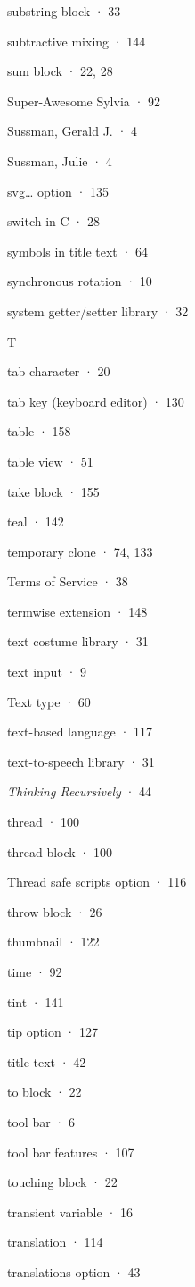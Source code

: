 \documentclass[
  letterpaper,
]{book}
\begin{document}
substring block · 33

subtractive mixing · 144

sum block · 22, 28

Super-Awesome Sylvia · 92

Sussman, Gerald J. · 4

Sussman, Julie · 4

svg\ldots{} option · 135

switch in C · 28

symbols in title text · 64

synchronous rotation · 10

system getter/setter library · 32

T

tab character · 20

tab key (keyboard editor) · 130

table · 158

table view · 51

take block · 155

teal · 142

temporary clone · 74, 133

Terms of Service · 38

termwise extension · 148

text costume library · 31

text input · 9

Text type · 60

text-based language · 117

text-to-speech library · 31

\emph{Thinking Recursively} · 44

thread · 100

thread block · 100

Thread safe scripts option · 116

throw block · 26

thumbnail · 122

time · 92

tint · 141

tip option · 127

title text · 42

to block · 22

tool bar · 6

tool bar features · 107

touching block · 22

transient variable · 16

translation · 114

translations option · 43
\end{document}

